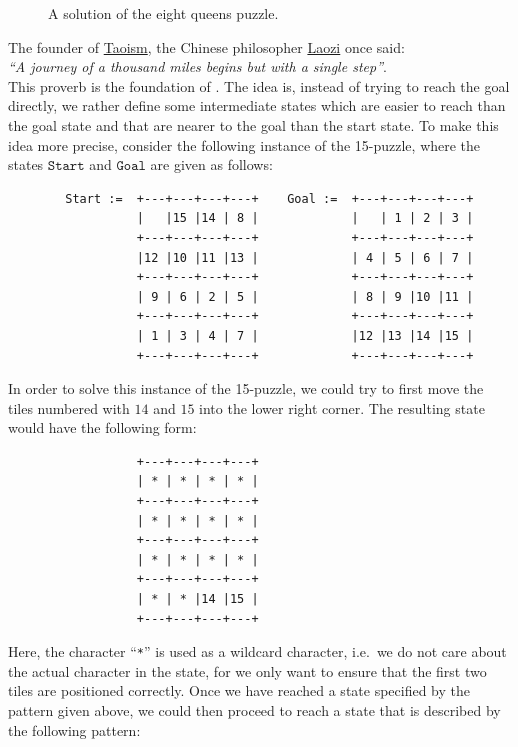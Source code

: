\begin{figure}[!ht]
\centering
{}
\caption{A solution of the eight queens puzzle.}
\label{fig:queens.pdf}
\end{figure}
\pagebreak
\vspace*{1cm}


\exercise
The founder of \href{https://en.wikipedia.org/wiki/Taoism}{Taoism}, the Chinese philosopher
\href{https://en.wikipedia.org/wiki/Laozi}{Laozi} once said:
\\[0.2cm]
\hspace*{1.3cm}
\textsl{``A journey of a thousand miles begins but with a single step''}.
\\[0.2cm]
This proverb is the foundation of .  The idea is, instead of trying to reach
the goal directly, we rather define some intermediate states which are easier to reach than the goal state and
that are nearer to the goal than the start state.  To make this idea more precise, consider the following instance of the
15-puzzle, where the states $\texttt{Start}$ and $\texttt{Goal}$ are given as follows:
\begin{verbatim}
        Start :=  +---+---+---+---+    Goal :=  +---+---+---+---+
                  |   |15 |14 | 8 |             |   | 1 | 2 | 3 |
                  +---+---+---+---+             +---+---+---+---+
                  |12 |10 |11 |13 |             | 4 | 5 | 6 | 7 |
                  +---+---+---+---+             +---+---+---+---+
                  | 9 | 6 | 2 | 5 |             | 8 | 9 |10 |11 |
                  +---+---+---+---+             +---+---+---+---+
                  | 1 | 3 | 4 | 7 |             |12 |13 |14 |15 |
                  +---+---+---+---+             +---+---+---+---+
 \end{verbatim}
 In order to solve this instance of the 15-puzzle, we could try to first move the tiles numbered with $14$ and
 $15$ into the lower right  corner.  The resulting state would have the following form:
 \begin{verbatim}
                  +---+---+---+---+
                  | * | * | * | * |
                  +---+---+---+---+
                  | * | * | * | * |
                  +---+---+---+---+
                  | * | * | * | * |
                  +---+---+---+---+
                  | * | * |14 |15 |
                  +---+---+---+---+
 \end{verbatim}
 Here, the character ``\texttt{*}'' is used as a wildcard character, i.e.~we do not care about the actual
 character in the state, for we only want to ensure that the first two tiles are positioned correctly.  Once we have reached a
 state specified by the pattern given above, we could then proceed to reach a state that is described by the
 following pattern:


